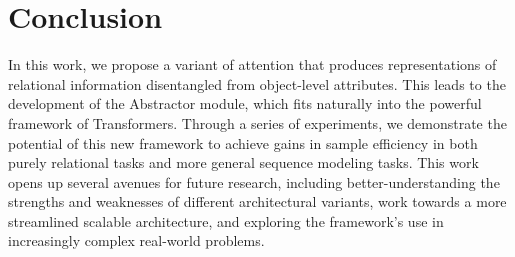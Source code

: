 \section{Conclusion}\label{sec:discuss}


In this work, we propose a variant of attention that produces representations of relational information disentangled from object-level attributes. This leads to the development of the Abstractor module, which fits naturally into the powerful framework of Transformers. Through a series of experiments, we demonstrate the potential of this new framework to achieve gains in sample efficiency in both purely relational tasks and more general sequence modeling tasks. This work opens up several avenues for future research, including better-understanding the strengths and weaknesses of different architectural variants, work towards a more streamlined scalable architecture, and exploring the framework's use in increasingly complex real-world problems.


